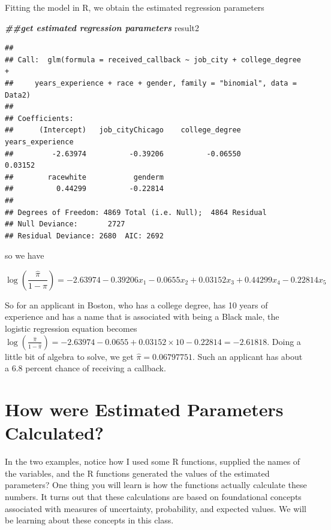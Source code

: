 \documentclass[
]{book}
\newenvironment{Shaded}{\begin{snugshade}}{\end{snugshade}}
\newcommand{\DocumentationTok}[1]{\textcolor[rgb]{0.56,0.35,0.01}{\textbf{\textit{#1}}}}
\newcommand{\NormalTok}[1]{#1}
\begin{document}
Fitting the model in R, we obtain the estimated regression parameters

\begin{Shaded}
\begin{Highlighting}[]
\DocumentationTok{\#\#get estimated regression parameters}
\NormalTok{result2}
\end{Highlighting}
\end{Shaded}

\begin{verbatim}
## 
## Call:  glm(formula = received_callback ~ job_city + college_degree + 
##     years_experience + race + gender, family = "binomial", data = Data2)
## 
## Coefficients:
##      (Intercept)   job_cityChicago    college_degree  years_experience  
##         -2.63974          -0.39206          -0.06550           0.03152  
##        racewhite           genderm  
##          0.44299          -0.22814  
## 
## Degrees of Freedom: 4869 Total (i.e. Null);  4864 Residual
## Null Deviance:       2727 
## Residual Deviance: 2680  AIC: 2692
\end{verbatim}

so we have

\[
\log (\frac{\hat{\pi}}{1-\hat{\pi}}) = -2.63974 - 0.39206 x_1 - 0.0655 x_2 + 0.03152 x_3 + 0.44299 x_4 - 0.22814 x_5
\]

So for an applicant in Boston, who has a college degree, has 10 years of experience and has a name that is associated with being a Black male, the logistic regression equation becomes \(\log (\frac{\hat{\pi}}{1-\hat{\pi}}) = -2.63974 - 0.0655 + 0.03152 \times 10 - 0.22814 = -2.61818\). Doing a little bit of algebra to solve, we get \(\hat{\pi} = 0.06797751\). Such an applicant has about a 6.8 percent chance of receiving a callback.

\hypertarget{how-were-estimated-parameters-calculated}{%
\section*{How were Estimated Parameters Calculated?}\label{how-were-estimated-parameters-calculated}}

In the two examples, notice how I used some R functions, supplied the names of the variables, and the R functions generated the values of the estimated parameters? One thing you will learn is how the functions actually calculate these numbers. It turns out that these calculations are based on foundational concepts associated with measures of uncertainty, probability, and expected values. We will be learning about these concepts in this class.
\end{document}
